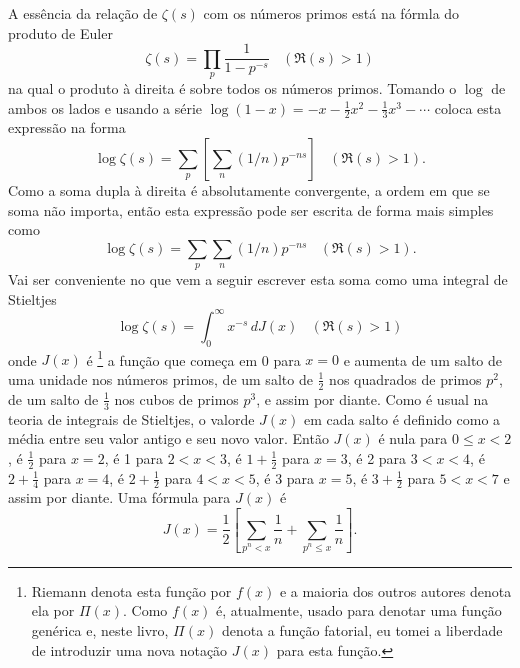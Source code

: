     
    A essência da relação de $\zeta(s)$ com os números primos está na fórmla do produto de Euler
    \begin{equation}
        \label{sec-1-11-(1)}
        \zeta(s) = \prod_{p} \frac{1}{1 - p^{-s}} \ \ \ \ (\Re(s)>1)
    \end{equation}
    na qual o produto à direita é sobre todos os números primos. Tomando o $\log$ de ambos os lados e usando a série $\log(1-x) = -x - \frac{1}{2}x^2 - \frac{1}{3}x^3 - \cdots$ coloca esta expressão na forma
    \begin{equation*}
        \log \zeta(s) = \sum_{p} \left[ \sum_n (1/n)p^{-ns} \right] \ \ \ \ (\Re(s)>1).
    \end{equation*}
    Como a soma dupla à direita é absolutamente convergente, a ordem em que se soma não importa, então esta expressão pode ser escrita de forma mais simples como
    \begin{equation}
        \label{sec-1-11-(2)}
        \log \zeta(s) = \sum_{p} \sum_n (1/n)p^{-ns} \ \ \ \ (\Re(s)>1).
    \end{equation}
    Vai ser conveniente no que vem a seguir escrever esta soma como uma integral de Stieltjes
    \begin{equation}
        \label{sec-1-11-(3)}
        \log \zeta(s) = \int_{0}^{\infty} x^{-s} \, dJ(x) \ \ \ \ (\Re(s)>1)
    \end{equation}
    onde $J(x)$ é
    \footnote{Riemann denota esta função por $f(x)$ e a maioria dos outros autores denota ela por $\Pi(x)$. Como $f(x)$ é, atualmente, usado para denotar uma função genérica e, neste livro, $\Pi(x)$ denota a função fatorial, eu tomei a liberdade de introduzir uma nova notação $J(x)$ para esta função.}
    a função que começa em 0 para $x = 0$ e aumenta de um salto de uma unidade nos números primos, de um salto de $\frac{1}{2}$ nos quadrados de primos $p^2$, de um salto de $\frac{1}{3}$ nos cubos de primos $p^3$, e assim por diante. Como é usual na teoria de integrais de Stieltjes, o valorde $J(x)$ em cada salto é definido como a média entre seu valor antigo e seu novo valor. Então $J(x)$ é nula para $0 \leq x < 2$, é $\frac{1}{2}$ para $x = 2$, é 1 para $2 < x < 3$, é $1 + \frac{1}{2}$ para $x = 3$, é 2 para $3 < x < 4$, é $2 + \frac{1}{4}$ para $x = 4$, é $2 + \frac{1}{2}$ para $4 < x < 5$, é 3 para $x = 5$, é $3 + \frac{1}{2}$ para $5 < x < 7$ e assim por diante. Uma fórmula para $J(x)$ é 
    \begin{equation*}
        J(x) = \frac{1}{2} \left[ \sum_{p^n < x} \frac{1}{n} + \sum_{p^n \leq x} \frac{1}{n} \right].
    \end{equation*}
    
